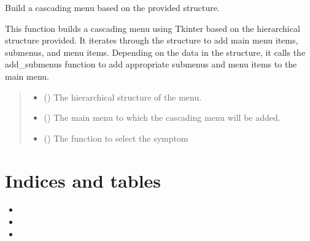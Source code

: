 \documentclass[letterpaper,10pt,english]{sphinxmanual}
\begin{document}
\begin{fulllineitems}
\label{\detokenize{annotation:annotation.exel_menus.build_menu}}
\pysigstartsignatures
{}
\pysigstopsignatures
\sphinxAtStartPar
Build a cascading menu based on the provided structure.

\sphinxAtStartPar
This function builds a cascading menu using Tkinter based on the
hierarchical structure provided. It iterates through the structure
to add main menu items, submenus, and menu items. Depending on the
data in the structure, it calls the add\_submenus function to add
appropriate submenus and menu items to the main menu.
\begin{quote}\begin{description}
\begin{itemize}
\item {} 
\sphinxAtStartPar
{} () \textendash{} The hierarchical structure of the menu.

\item {} 
\sphinxAtStartPar
{} () \textendash{} The main menu to which the cascading menu will be added.

\item {} 
\sphinxAtStartPar
{} () \textendash{} The function to select the symptom

\end{itemize}

\end{description}\end{quote}

\end{fulllineitems}



\chapter{Indices and tables}
\label{\detokenize{index:indices-and-tables}}\begin{itemize}
\item {} 
\sphinxAtStartPar
{}

\item {} 
\sphinxAtStartPar
{}

\item {} 
\sphinxAtStartPar
{}

\end{itemize}
\end{document}
